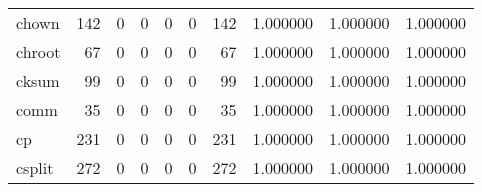 \begin{tabular}{lrrrrrrrrr}
chown     &                                       142 &                                                  0 &                                                  0 &                                                  0 &                                                  0 &                                                142 &                                           1.000000 &                               1.000000 &                             1.000000 \\
chroot    &                                        67 &                                                  0 &                                                  0 &                                                  0 &                                                  0 &                                                 67 &                                           1.000000 &                               1.000000 &                             1.000000 \\
cksum     &                                        99 &                                                  0 &                                                  0 &                                                  0 &                                                  0 &                                                 99 &                                           1.000000 &                               1.000000 &                             1.000000 \\
comm      &                                        35 &                                                  0 &                                                  0 &                                                  0 &                                                  0 &                                                 35 &                                           1.000000 &                               1.000000 &                             1.000000 \\
cp        &                                       231 &                                                  0 &                                                  0 &                                                  0 &                                                  0 &                                                231 &                                           1.000000 &                               1.000000 &                             1.000000 \\
csplit    &                                       272 &                                                  0 &                                                  0 &                                                  0 &                                                  0 &                                                272 &                                           1.000000 &                               1.000000 &                             1.000000 \\

\end{tabular}
